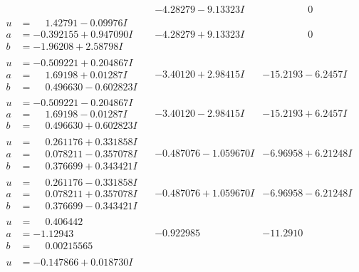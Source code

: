 \documentclass[1p]{elsarticle_modified}
\theoremstyle{definition}
\begin{document}
$$\begin{array}{c|c|c}
 & -4.28279 - 9.13323 I & \phantom{-0.000000 } 0 \\ \hline\begin{aligned}
u &= \phantom{-}1.42791 - 0.09976 I \\
a &= -0.392155 + 0.947090 I \\
b &= -1.96208 + 2.58798 I\end{aligned}
 & -4.28279 + 9.13323 I & \phantom{-0.000000 } 0 \\ \hline\begin{aligned}
u &= -0.509221 + 0.204867 I \\
a &= \phantom{-}1.69198 + 0.01287 I \\
b &= \phantom{-}0.496630 - 0.602823 I\end{aligned}
 & -3.40120 + 2.98415 I & -15.2193 - 6.2457 I \\ \hline\begin{aligned}
u &= -0.509221 - 0.204867 I \\
a &= \phantom{-}1.69198 - 0.01287 I \\
b &= \phantom{-}0.496630 + 0.602823 I\end{aligned}
 & -3.40120 - 2.98415 I & -15.2193 + 6.2457 I \\ \hline\begin{aligned}
u &= \phantom{-}0.261176 + 0.331858 I \\
a &= \phantom{-}0.078211 - 0.357078 I \\
b &= \phantom{-}0.376699 + 0.343421 I\end{aligned}
 & -0.487076 - 1.059670 I & -6.96958 + 6.21248 I \\ \hline\begin{aligned}
u &= \phantom{-}0.261176 - 0.331858 I \\
a &= \phantom{-}0.078211 + 0.357078 I \\
b &= \phantom{-}0.376699 - 0.343421 I\end{aligned}
 & -0.487076 + 1.059670 I & -6.96958 - 6.21248 I \\ \hline\begin{aligned}
u &= \phantom{-}0.406442\phantom{ +0.000000I} \\
a &= -1.12943\phantom{ +0.000000I} \\
b &= \phantom{-}0.00215565\phantom{ +0.000000I}\end{aligned}
 & -0.922985\phantom{ +0.000000I} & -11.2910\phantom{ +0.000000I} \\ \hline\begin{aligned}
u &= -0.147866 + 0.018730 I \\

\end{aligned}
\end{array}$$
\end{document}
